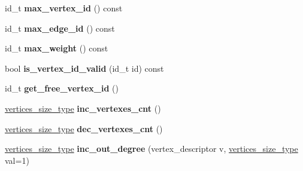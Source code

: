 \begin{DoxyCompactItemize}
\item 
\mbox{\label{class_s_p_u___g_r_a_p_h_1_1_spu_ultra_graph_ab737d34a76c1712bc84ca7990481d2fc}} 
id\+\_\+t {\bfseries max\+\_\+vertex\+\_\+id} () const
\item 
\mbox{\label{class_s_p_u___g_r_a_p_h_1_1_spu_ultra_graph_a7a4e46b23fdaf3d3e51865a2b6812bce}} 
id\+\_\+t {\bfseries max\+\_\+edge\+\_\+id} () const
\item 
\mbox{\label{class_s_p_u___g_r_a_p_h_1_1_spu_ultra_graph_aab82648f43be4f893c946652d75d9009}} 
id\+\_\+t {\bfseries max\+\_\+weight} () const
\item 
\mbox{\label{class_s_p_u___g_r_a_p_h_1_1_spu_ultra_graph_accb02121a50d69bf3f03d45aa2c904d6}} 
bool {\bfseries is\+\_\+vertex\+\_\+id\+\_\+valid} (id\+\_\+t id) const
\item 
\mbox{\label{class_s_p_u___g_r_a_p_h_1_1_spu_ultra_graph_a40a9aef9c9a3a06bc0b7b50907ca813d}} 
id\+\_\+t {\bfseries get\+\_\+free\+\_\+vertex\+\_\+id} ()
\item 
\mbox{\label{class_s_p_u___g_r_a_p_h_1_1_spu_ultra_graph_a77f02ba5ba51856e46cb978d1c7eca76}} 
\hyperlink{class_s_p_u___g_r_a_p_h_1_1_spu_ultra_graph_af8312efee580452b40e3750d8acf3b08}{vertices\+\_\+size\+\_\+type} {\bfseries inc\+\_\+vertexes\+\_\+cnt} ()
\item 
\mbox{\label{class_s_p_u___g_r_a_p_h_1_1_spu_ultra_graph_a7284a29b119ca4c90cb9edd24afcdf43}} 
\hyperlink{class_s_p_u___g_r_a_p_h_1_1_spu_ultra_graph_af8312efee580452b40e3750d8acf3b08}{vertices\+\_\+size\+\_\+type} {\bfseries dec\+\_\+vertexes\+\_\+cnt} ()
\item 
\mbox{\label{class_s_p_u___g_r_a_p_h_1_1_spu_ultra_graph_a964caeb8a151b899a994b97ae728b4be}} 
\hyperlink{class_s_p_u___g_r_a_p_h_1_1_spu_ultra_graph_af8312efee580452b40e3750d8acf3b08}{vertices\+\_\+size\+\_\+type} {\bfseries inc\+\_\+out\+\_\+degree} (vertex\+\_\+descriptor v, \hyperlink{class_s_p_u___g_r_a_p_h_1_1_spu_ultra_graph_af8312efee580452b40e3750d8acf3b08}{vertices\+\_\+size\+\_\+type} val=1)

\end{DoxyCompactItemize}
